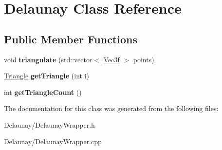 \hypertarget{class_delaunay}{}\section{Delaunay Class Reference}
\label{class_delaunay}
\subsection*{Public Member Functions}
\begin{DoxyCompactItemize}
\item 
\mbox{\label{class_delaunay_a2032286ef2b22be353efc1cac3cc1bb1}} 
void {\bfseries triangulate} (std\+::vector$<$ \hyperlink{struct_vec3f}{Vec3f} $>$ points)
\item 
\mbox{\label{class_delaunay_a1915c50101c501a10b6a7a70ea6acb96}} 
\hyperlink{class_triangle}{Triangle} {\bfseries get\+Triangle} (int i)
\item 
\mbox{\label{class_delaunay_abad022378658b18b9cee87f1cefbd2cd}} 
int {\bfseries get\+Triangle\+Count} ()
\end{DoxyCompactItemize}


The documentation for this class was generated from the following files\+:\begin{DoxyCompactItemize}
\item 
Delaunay/Delaunay\+Wrapper.\+h\item 
Delaunay/Delaunay\+Wrapper.\+cpp\end{DoxyCompactItemize}

